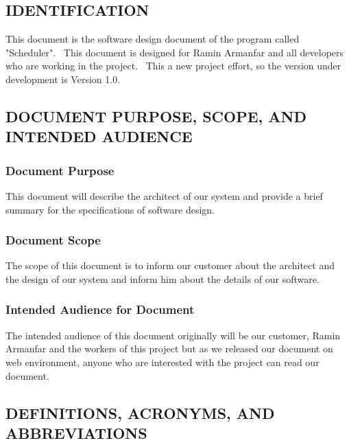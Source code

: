 \documentclass[twoside,letterpaper]{article}
\begin{document}
\subsection{IDENTIFICATION}

This document is the software design document of the program called "Scheduler". \ This document is designed for Ramin Armanfar and all developers who are working in the project. \  This a new project effort, so the version under development is Version 1.0.

\subsection{DOCUMENT PURPOSE, SCOPE, AND INTENDED AUDIENCE}

\subsubsection{Document Purpose}

This document will describe the architect of our system and provide a brief summary for the specifications of software design.

\subsubsection{Document Scope}
The scope of this document is to inform our customer about the architect and the design of our system and inform him about the details of our software.

\subsubsection{Intended Audience for Document}

The intended audience of this document originally will be our customer, Ramin Armanfar and the workers of this project but as we released our document on web environment, anyone who are interested with the project can read our document.


\subsection{DEFINITIONS, ACRONYMS, AND ABBREVIATIONS}
\end{document}
